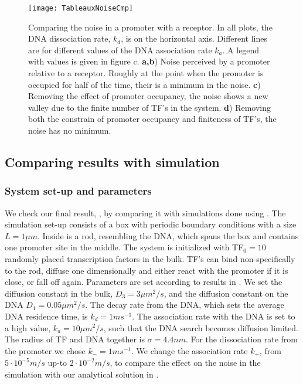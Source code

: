\begin{figure}
\texttt{[image: TableauxNoiseCmp]}
\caption{ Comparing the noise in a promoter with a receptor. In all plots, the DNA dissociation rate, $k_d$, is on the horizontal axis. Different lines are for different values of the DNA association rate $k_a$. A legend with values is given in figure c. {\bf a,b}) Noise perceived by a promoter relative to a receptor. Roughly at the point when the promoter is occupied for half of the time, their is a minimum in the noise. {\bf c}) Removing the effect of promoter occupancy, the noise shows a new valley due to the finite number of TF's in the system. {\bf d}) Removing both the constrain of promoter occupancy and finiteness of TF's, the noise has no minimum.
}
\end{figure}



\subsection{Comparing results with simulation}

\subsubsection{System set-up and parameters}
We check our final result, , by comparing it with simulations done using \GFRD. The simulation set-up consists of a box with periodic boundary conditions with a size $L=1\mu m$. Inside is a rod, resembling the DNA, which spans the box and contains one promoter site in the middle. The system is initialized with TF$_0=10$ randomly placed transcription factors in the bulk. TF's can bind non-specifically to the rod, diffuse one dimensionally and either react with the promoter if it is close, or fall off again. Parameters are set according to results in \cite{Elf2007a}. We set the diffusion constant in the bulk, $D_3=3 \mu m^2/s$, and the diffusion constant on the DNA $D_1=0.05 \mu m^2/s$. The decay rate from the DNA, which sets the average DNA residence time, is $k_d=1ms^{-1}$. The association rate with the DNA is set to a high value, $k_a=10\mu m^2/s$, such that the DNA search becomes diffusion limited. The radius of TF and DNA together is $\sigma=4.4nm$. For the dissociation rate from the promoter we chose $k_-=1 ms^{-1}$. We change the association rate $k_+$, from $5\cdot10^{-5} m/s$ up-to $2\cdot10^{-2} m/s$, to compare the effect on the noise in the simulation with our analytical solution in . 

